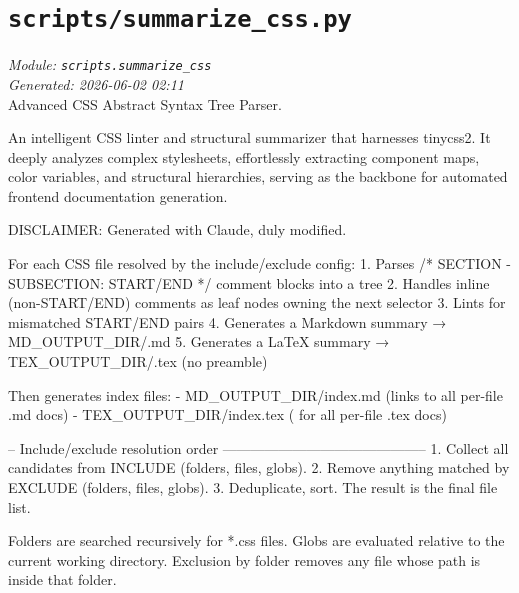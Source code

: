 
\section{\texttt{scripts/summarize\_css.py}}
\textit{Module: \texttt{scripts.summarize\_css}} \\
\textit{Generated: 2026-06-02 02:11} \\

Advanced CSS Abstract Syntax Tree Parser.

An intelligent CSS linter and structural summarizer that harnesses
tinycss2. It deeply analyzes complex stylesheets, effortlessly
extracting component maps, color variables, and structural hierarchies,
serving as the backbone for automated frontend documentation generation.

DISCLAIMER: Generated with Claude, duly modified.

For each CSS file resolved by the include/exclude config: 1. Parses /*
SECTION - SUBSECTION: START/END */ comment blocks into a tree 2. Handles
inline (non-START/END) comments as leaf nodes owning the next selector
3. Lints for mismatched START/END pairs 4. Generates a Markdown summary
→ MD\_OUTPUT\_DIR/.md 5. Generates a LaTeX summary →
TEX\_OUTPUT\_DIR/.tex (no preamble)

Then generates index files: - MD\_OUTPUT\_DIR/index.md (links to all
per-file .md docs) - TEX\_OUTPUT\_DIR/index.tex ( for all
per-file .tex docs)

-- Include/exclude resolution order
-------------------------------------------- 1. Collect all candidates
from INCLUDE (folders, files, globs). 2. Remove anything matched by
EXCLUDE (folders, files, globs). 3. Deduplicate, sort. The result is the
final file list.

Folders are searched recursively for *.css files. Globs are evaluated
relative to the current working directory. Exclusion by folder removes
any file whose path is inside that folder.

